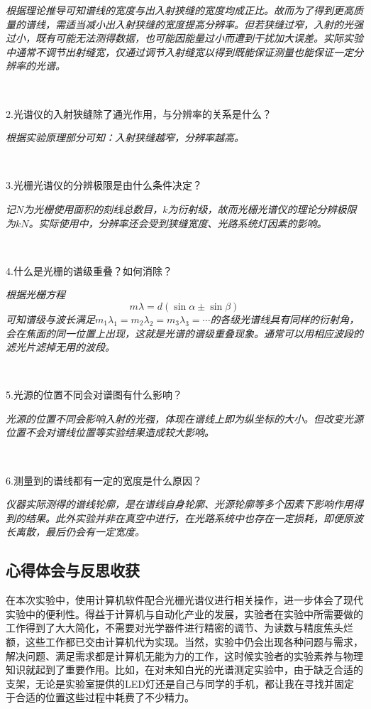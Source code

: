 \documentclass[UTF-8,twoside,cs4size]{ctexart}
\begin{document}
	\textit{根据理论推导可知谱线的宽度与出入射狭缝的宽度均成正比。故而为了得到更高质量的谱线，需适当减小出入射狭缝的宽度提高分辨率。但若狭缝过窄，入射的光强过小，既有可能无法测得数据，也可能因能量过小而遭到干扰加大误差。实际实验中通常不调节出射缝宽，仅通过调节入射缝宽以得到既能保证测量也能保证一定分辨率的光谱。}
	
	~\
	
	2.光谱仪的入射狭缝除了通光作用，与分辨率的关系是什么？
	
	\textit{根据实验原理部分可知：入射狭缝越窄，分辨率越高。}
	
	~\
	
	3.光栅光谱仪的分辨极限是由什么条件决定？
	
	\textit{记$ N $为光栅使用面积的刻线总数目，$ k $为衍射级，故而光栅光谱仪的理论分辨极限为$ kN $。实际使用中，分辨率还会受到狭缝宽度、光路系统灯因素的影响。}
	
	~\
	
	4.什么是光栅的谱级重叠？如何消除？
	
	\textit{根据光栅方程}
	\[m\lambda=d(\sin\alpha\pm\sin\beta)\]
	\textit{可知谱级与波长满足$ m_1\lambda_1=m_2\lambda_2=m_3\lambda_3=\cdots $的各级光谱线具有同样的衍射角，会在焦面的同一位置上出现，这就是光谱的谱级重叠现象。通常可以用相应波段的滤光片滤掉无用的波段。}
	
	~\
	
	5.光源的位置不同会对谱图有什么影响？
	
	\textit{光源的位置不同会影响入射的光强，体现在谱线上即为纵坐标的大小。但改变光源位置不会对谱线位置等实验结果造成较大影响。}
	
	~\
	
	6.测量到的谱线都有一定的宽度是什么原因？
	
	\textit{仪器实际测得的谱线轮廓，是在谱线自身轮廓、光源轮廓等多个因素下影响作用得到的结果。此外实验并非在真空中进行，在光路系统中也存在一定损耗，即便原波长离散，最后仍会有一定宽度。}
	
	\newpage
	
	\subsection{心得体会与反思收获}
	在本次实验中，使用计算机软件配合光栅光谱仪进行相关操作，进一步体会了现代实验中的便利性。得益于计算机与自动化产业的发展，实验者在实验中所需要做的工作得到了大大简化，不需要对光学器件进行精密的调节、为读数与精度焦头烂额，这些工作都已交由计算机代为实现。当然，实验中仍会出现各种问题与需求，解决问题、满足需求都是计算机无能为力的工作，这时候实验者的实验素养与物理知识就起到了重要作用。比如，在对未知白光的光谱测定实验中，由于缺乏合适的支架，无论是实验室提供的LED灯还是自己与同学的手机，都让我在寻找并固定于合适的位置这些过程中耗费了不少精力。
\end{document}
